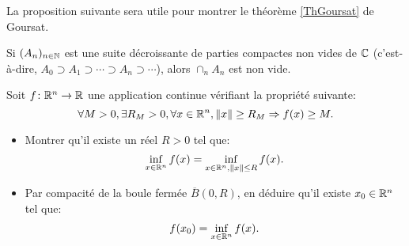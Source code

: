 La proposition suivante sera utile pour montrer le théorème \ref{ThGoursat} de Goursat.
\begin{prop}
Si $(A_n)_{n \in {\mathbb N}}$ est une suite décroissante de parties compactes non vides de $\mathbb{C}$ (c'est-à-dire, $A_0 \supset A_1 \supset \cdots \supset A_n \supset \cdots $), alors $\cap_n A_n$ est non vide.
\end{prop}
\begin{exercice}
    Soit $f \colon \mathbb R^n \to \mathbb R$ une application continue vérifiant la propriété suivante:
    \[
    \forall M > 0, \exists R_M > 0, \forall x \in \mathbb R^n, \| x \| \geq R_M \Rightarrow f(x) \geq M. 
    \]
    \begin{itemize}
        \item Montrer qu'il existe un réel $R > 0$ tel que:
        \[\inf_{x\in \mathbb R^n} f(x) = \inf_{x\in \mathbb R^n, \|x\| \leq R} f(x).\]
        \item Par compacité de la boule fermée $\overline{B}(0,R)$, en déduire qu'il existe $x_0 \in \mathbb R^n$ tel que:
        \[
        f(x_0) = \inf_{x\in \mathbb R^n} f(x).
        \]
    \end{itemize}
\end{exercice}


